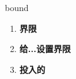 
\begin{frame}
{\huge bound}
\begin{center}
\begin{enumerate}\Large
  \item \textbf{界限}
  \item \textbf{给...设置界限}
  \item \textbf{投入的}
\end{enumerate}
\end{center}
\end{frame}
